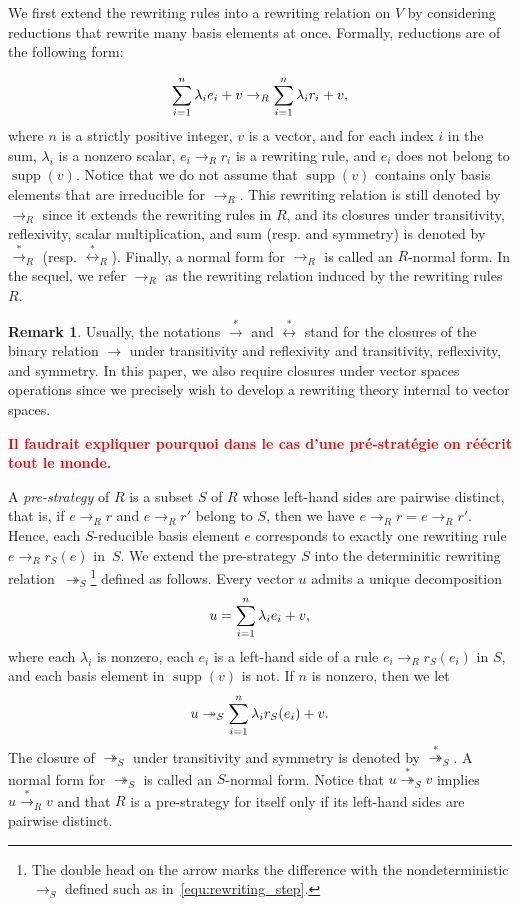 \documentclass[10pt]{easychair}
\theoremstyle{definition}
\newtheorem{remark}[theorem]{Remark}
\newcommand\todo[1]{{\bf\textcolor{red}{#1}}}
\DeclareMathOperator{\supp}{supp}
\newcommand\rewR{\to_R}
\newcommand\rewS{\twoheadrightarrow_S}
\newcommand\transR{\overset{*}{\to}_R}
\newcommand\transS{\overset{*}{\twoheadrightarrow}_S}
\newcommand\equivR{\overset{*}{\leftrightarrow}_R}
\begin{document}
We first extend the rewriting rules into a rewriting relation on $V$ by
considering reductions that rewrite many basis elements at once.
Formally, reductions are of the following form: 

\begin{equation}\label{equ:rewriting_step}
  \sum_{i=1}^n\lambda_ie_i+v\rewR\sum_{i=1}^n\lambda_ir_i+v,
  \smallskip
\end{equation}
where $n$ is a strictly positive integer, $v$ is a vector, and for each
index $i$ in the sum, $\lambda_i$ is a nonzero scalar, $e_i\rewR r_i$ is
a rewriting rule, and $e_i$ does not belong to $\supp(v)$. Notice that we
do not assume that $\supp(v)$ contains only basis elements that are
irreducible for $\rewR$. This rewriting relation is still denoted by
$\rewR$ since it extends the rewriting rules in $R$, and its closures
under transitivity, reflexivity, scalar multiplication, and sum
(resp. and symmetry) is denoted by $\transR$ (resp. $\equivR$). Finally,
a normal form for $\rewR$ is called an $R$-normal form. In the sequel, we
refer $\rewR$ as the rewriting relation induced by the rewriting rules
$R$.
\smallskip

\begin{remark}
  Usually, the notations $\overset{*}{\to}$ and
  $\overset{*}{\leftrightarrow}$
  stand for the closures of the binary relation $\to$ under transitivity
  and reflexivity and transitivity, reflexivity, and symmetry. In this
  paper, we also require closures under vector spaces operations since we
  precisely wish to develop a rewriting theory internal to vector spaces.
\end{remark}
\smallskip

\todo{Il faudrait expliquer pourquoi dans le cas d'une pré-stratégie on
  réécrit tout le monde.}

A {\em pre-strategy} of $R$ is a subset $S$ of $R$ whose left-hand sides 
are pairwise distinct, that is, if $e\rewR r$ and $e\rewR r'$ belong to
$S$, then we have $e\rewR r=e\rewR r'$. Hence,
each $S$-reducible basis element $e$ corresponds to exactly one rewriting
rule $e\rewR r_S(e)$ in~$S$. We extend the pre-strategy $S$ into the
determinitic rewriting relation~$\rewS$\footnote{The double head on the
  arrow marks the difference with the nondeterministic $\to_S$ defined
  such as in~\eqref{equ:rewriting_step}.} defined as follows. Every
vector $u$ admits a unique decomposition 
\[u=\sum_{i=1}^n\lambda_ie_i+v,
\smallskip\]
where each $\lambda_i$ is nonzero, each $e_i$ is a left-hand side of a
rule $e_i\rewR r_S(e_i)$ in $S$, and each basis element in $\supp(v)$ is
not. If $n$ is nonzero, then we let
\[u\rewS\sum_{i=1}^n\lambda_ir_S(e_i)+v.
\smallskip\]
The closure of $\rewS$ under transitivity and symmetry is denoted by
$\transS$. A normal form for $\rewS$ is called an $S$-normal form. Notice
that $u\transS v$ implies $u\transR v$ and that $R$ is a pre-strategy for
itself only if its left-hand sides are pairwise distinct. 
\smallskip
\end{document}
